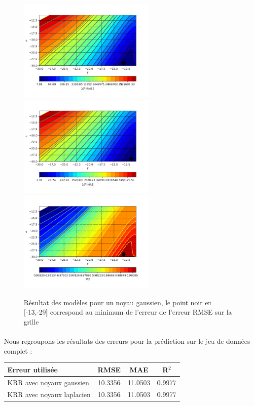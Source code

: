 \documentclass[a4paper,12pt,titlepage]{report}
\begin{document}
	\begin{figure}[!h]	
		\begin{center}
		\includegraphics[height = 5cm, keepaspectratio]{graphes/resultat_RBF_RMSE.png}
		\includegraphics[height = 5cm, keepaspectratio]{graphes/resultat_RBF_MAE.png}
		\includegraphics[height = 5cm, keepaspectratio]{graphes/resultat_RBF_R2.png}
	\caption{Résultat des modèles pour un noyau gaussien, le point noir en [-13,-29] correspond au minimum de l'erreur de l'erreur RMSE sur la grille}
		\end{center}
	\end{figure}
\paragraph{}
Nous regroupons les résultats des erreurs pour la prédiction sur le jeu de données complet : \\
\begin{center}
\begin{tabular}{ l| c c c }

   Erreur utilisée  & RMSE & MAE & R$^2$ \\
   \hline
   KRR avec noyaux gaussien & 10.3356 & 11.0503 & 0.9977\\
   KRR avec noyaux laplacien  & 10.3356 & 11.0503 & 0.9977\\
  \end{tabular}
  \end{center}
  
  
  
  
  
\end{document}
